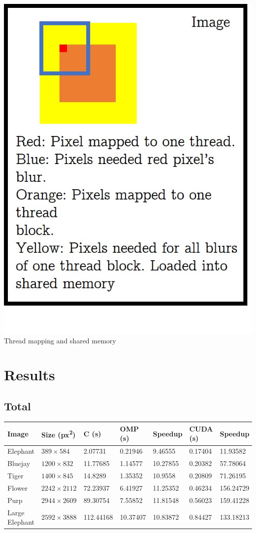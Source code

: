 \documentclass[12pt]{article}
\begin{document}
\begin{center}
\includegraphics[scale=0.3]{mapping.jpg} \\
Thread mapping and shared memory
\end{center}

\section{Results}

\subsection{Total}
\begin{tabular}{l|l|l|l|l|l}
    Image & Size (px\textsuperscript{2}) & C (s) & OMP (s) & Speedup & CUDA (s) & Speedup
\\  \hline
    Elephant & $389 \times 584$ & 2.07731 & 0.21946 & 9.46555 & 0.17404 & 11.93582
\\  Bluejay & $1200 \times 832$ & 11.77685 & 1.14577 & 10.27855 & 0.20382 & 57.78064
\\  Tiger & $1400 \times 845$ & 14.8289 & 1.35352 & 10.9558 & 0.20809 & 71.26195
\\  Flower & $2242 \times 2112$ & 72.23937 & 6.41927 & 11.25352 & 0.46234 & 156.24729
\\  Purp & $2944 \times 2609$ & 89.30754 & 7.55852 & 11.81548 & 0.56023 & 159.41228
\\  Large Elephant & $2592 \times 3888$  & 112.44168 & 10.37407 & 10.83872 & 0.84427 & 133.18213
\end{tabular}
\end{document}
